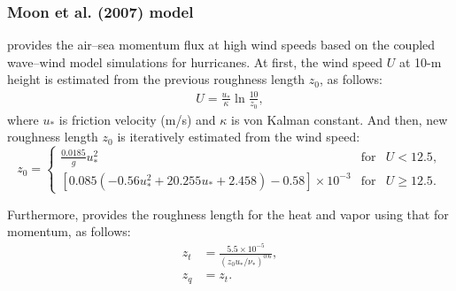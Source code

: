 \subsubsection{Moon et al. (2007) model}
\citet{moon_2007} provides the air--sea momentum flux at high wind speeds
based on the coupled wave--wind model simulations for hurricanes.
At first, the wind speed $U$ at 10-m height is estimated from the previous roughness length $z_0$, as follows:
\begin{align}
  U =\frac{u_{*}}{\kappa} \ln \frac{10}{z_0},
\end{align}
where
$u_{*}$ is friction velocity (m/s)
and $\kappa$ is von Kalman constant.
And then, new roughness length $z_0$ is iteratively estimated from the wind speed:
\begin{equation}
  z_0   = \left\{
  \begin{array}{lll}
    \frac{0.0185}{g} u_{*}^2 & \mathrm{for} & U < 12.5, \\
    \left[ 0.085 \left( -0.56 u_{*}^2 + 20.255 u_{*} + 2.458 \right) - 0.58 \right] \times 10^{-3} & \mathrm{for} & U \ge 12.5.
   \end{array} \right.
\end{equation}

Furthermore, \citet{Fairall_2003} provides the roughness length for the heat and vapor
using that for momentum, as follows:
\begin{align}
  z_t &= \frac{ 5.5 \times 10^{-5} }{ ( z_0 u_{*} / \nu_{*} )^{0.6} }, \\
  z_q &= z_t.
\end{align}

